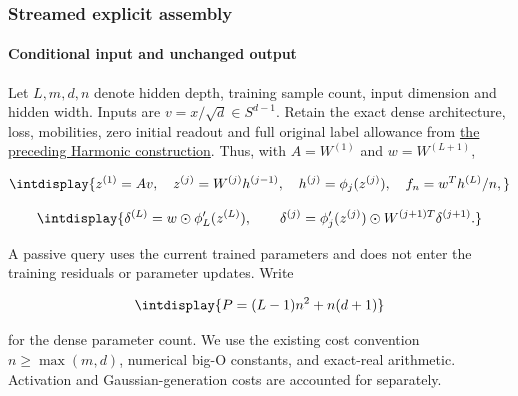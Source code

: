 \subsubsection{Streamed explicit assembly}
\label{int:setup-assembly}

\paragraph{Conditional input and unchanged output}
\label{int:setup-assembly-1}
\mbox{}\par\smallskip


Let \(L,\allowbreak m,\allowbreak d,\allowbreak n\) denote hidden depth, training sample count, input dimension and hidden width. Inputs are \(v=x/\sqrt d\in S^{d-1}\). Retain the exact dense architecture, loss, mobilities, zero initial readout and full original label allowance from \hyperref[int:harmonic-construction]{the preceding Harmonic construction}. Thus, with \(A=W^{(1)}\) and \(w=W^{(L+1)}\),


\begingroup\renewcommand{\theHequation}{intdisplay.996}
\begin{equation*}
\intdisplay{
z^{(1)}=Av,\quad z^{(j)}=W^{(j)}h^{(j-1)},\quad
h^{(j)}=\phi_j(z^{(j)}),\quad f_n=w^Th^{(L)}/n,
}
\end{equation*}
\endgroup

\begingroup\renewcommand{\theHequation}{intdisplay.997}
\begin{equation*}
\intdisplay{
\delta^{(L)}=w\odot\phi_L'(z^{(L)}),\qquad
\delta^{(j)}=\phi_j'(z^{(j)})\odot
                  W^{(j+1)T}\delta^{(j+1)}.
}
\end{equation*}
\endgroup


A passive query uses the current trained parameters and does not enter the training residuals or parameter updates. Write


\begingroup\renewcommand{\theHequation}{intdisplay.998}
\begin{equation*}
\intdisplay{
P=(L-1)n^2+n(d+1)
}
\end{equation*}
\endgroup


for the dense parameter count. We use the existing cost convention \(n\ge\max(m,\allowbreak d)\), numerical big-O constants, and exact-real arithmetic. Activation and Gaussian-generation costs are accounted for separately.


